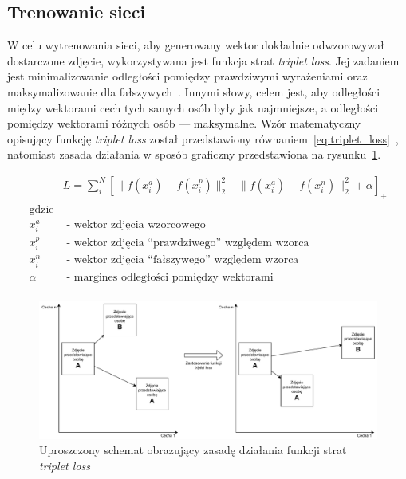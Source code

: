 \subsection{Trenowanie sieci}

W celu wytrenowania sieci, aby generowany wektor dokładnie odwzorowywał dostarczone zdjęcie,
wykorzystywana jest funkcja strat \textit{triplet loss}.
Jej zadaniem jest minimalizowanie odległości pomiędzy prawdziwymi
wyrażeniami oraz maksymalizowanie dla fałszywych~\cite{chechik2010large}.
Innymi słowy, celem jest, aby odległości między wektorami cech tych samych osób były jak najmniejsze,
a odległości pomiędzy wektorami różnych osób --- maksymalne.
Wzór matematyczny opisujący funkcję \textit{triplet loss} został przedstawiony
równaniem~\ref{eq:triplet_loss}~\cite{schroff2015facenet},
natomiast zasada działania w sposób graficzny przedstawiona na rysunku~\ref{fig:triplet_loss}.


\begin{equation}
    \begin{aligned}
        &L = \sum_{i}^{N} [  \| f(x_i^a) - f(x_i^p) \| ^2_2 - \| f(x_i^a) - f(x_i^n) \| ^2_2 + \alpha ] _+ \\
        \text{gdzie} & \\
        x_i^a & \text{ - wektor zdjęcia wzorcowego}\\
        x_i^p & \text{ - wektor zdjęcia ``prawdziwego'' względem wzorca}\\
        x_i^n & \text{ - wektor zdjęcia ``fałszywego'' względem wzorca}\\
        \alpha & \text{ - margines odległości pomiędzy wektorami} \\
    \end{aligned}
    \label{eq:triplet_loss}
\end{equation}

\begin{figure}[H]
    \centering
    \includegraphics[width=1\textwidth]{images/triplet_loss}
    \caption{ Uproszczony schemat obrazujący zasadę działania funkcji strat \textit{triplet loss} }
    \customsource
    \label{fig:triplet_loss}
\end{figure}

